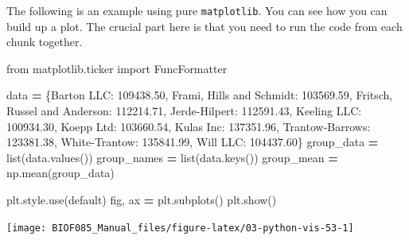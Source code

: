 \documentclass[
  letterpaper,
]{scrbook}
\newenvironment{Shaded}{\begin{snugshade}}{\end{snugshade}}
\newcommand{\BuiltInTok}[1]{#1}
\newcommand{\FloatTok}[1]{\textcolor[rgb]{0.00,0.00,0.81}{#1}}
\newcommand{\ImportTok}[1]{#1}
\newcommand{\NormalTok}[1]{#1}
\newcommand{\OperatorTok}[1]{\textcolor[rgb]{0.81,0.36,0.00}{\textbf{#1}}}
\newcommand{\StringTok}[1]{\textcolor[rgb]{0.31,0.60,0.02}{#1}}
\begin{document}
The following is an example using pure \texttt{matplotlib}. You can see how you can build up a plot. The crucial part here is that you need to run the code from each chunk together.

\begin{Shaded}
\begin{Highlighting}[]
\ImportTok{from}\NormalTok{ matplotlib.ticker }\ImportTok{import}\NormalTok{ FuncFormatter}

\NormalTok{data }\OperatorTok{=}\NormalTok{ \{}\StringTok{\textquotesingle{}Barton LLC\textquotesingle{}}\NormalTok{: }\FloatTok{109438.50}\NormalTok{,}
        \StringTok{\textquotesingle{}Frami, Hills and Schmidt\textquotesingle{}}\NormalTok{: }\FloatTok{103569.59}\NormalTok{,}
        \StringTok{\textquotesingle{}Fritsch, Russel and Anderson\textquotesingle{}}\NormalTok{: }\FloatTok{112214.71}\NormalTok{,}
        \StringTok{\textquotesingle{}Jerde{-}Hilpert\textquotesingle{}}\NormalTok{: }\FloatTok{112591.43}\NormalTok{,}
        \StringTok{\textquotesingle{}Keeling LLC\textquotesingle{}}\NormalTok{: }\FloatTok{100934.30}\NormalTok{,}
        \StringTok{\textquotesingle{}Koepp Ltd\textquotesingle{}}\NormalTok{: }\FloatTok{103660.54}\NormalTok{,}
        \StringTok{\textquotesingle{}Kulas Inc\textquotesingle{}}\NormalTok{: }\FloatTok{137351.96}\NormalTok{,}
        \StringTok{\textquotesingle{}Trantow{-}Barrows\textquotesingle{}}\NormalTok{: }\FloatTok{123381.38}\NormalTok{,}
        \StringTok{\textquotesingle{}White{-}Trantow\textquotesingle{}}\NormalTok{: }\FloatTok{135841.99}\NormalTok{,}
        \StringTok{\textquotesingle{}Will LLC\textquotesingle{}}\NormalTok{: }\FloatTok{104437.60}\NormalTok{\}}
\NormalTok{group\_data }\OperatorTok{=} \BuiltInTok{list}\NormalTok{(data.values())}
\NormalTok{group\_names }\OperatorTok{=} \BuiltInTok{list}\NormalTok{(data.keys())}
\NormalTok{group\_mean }\OperatorTok{=}\NormalTok{ np.mean(group\_data)}
\end{Highlighting}
\end{Shaded}

\begin{Shaded}
\begin{Highlighting}[]
\NormalTok{plt.style.use(}\StringTok{\textquotesingle{}default\textquotesingle{}}\NormalTok{)}
\NormalTok{fig, ax }\OperatorTok{=}\NormalTok{ plt.subplots()}
\NormalTok{plt.show()}
\end{Highlighting}
\end{Shaded}

\begin{center}\texttt{[image: BIOF085\_Manual\_files/figure-latex/03-python-vis-53-1]} \end{center}
\end{document}
